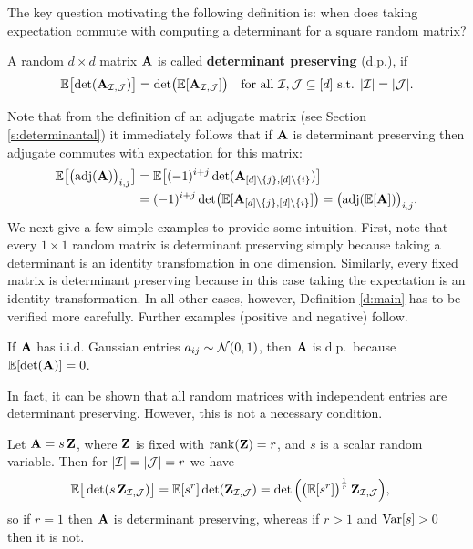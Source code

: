 \documentclass[11pt]{article}
\begin{document}
The key question motivating the following definition is: when does taking expectation commute with computing a determinant for a square random matrix? 
\begin{definition}\label{d:main}
A random $d\times d$ matrix $\mathbf A$ is called \textbf{determinant
  preserving} (d.p.), if
\begin{align*}
  \mathbb E\big[\!\det(\mathbf A_{\mathcal I,\mathcal{J}})\big] =
  \det\!\big(\mathbb E[\mathbf A_{\mathcal I,\mathcal{J}}]\big)\quad \text{for all }\mathcal I,\mathcal{J}\subseteq
  [d]\text{ s.t. }|\mathcal I|=|\mathcal{J}|.
\end{align*}
\end{definition}
Note that from the definition of an adjugate matrix (see Section
\ref{s:determinantal}) it immediately follows that if $\mathbf A$ is
determinant preserving then adjugate commutes with expectation for this matrix:
\begin{align}
  \mathbb E\big[\big(\!\operatorname{\textnormal{adj}}(\mathbf A)\big)_{i,j}\big] &=
  \mathbb E\big[(-1)^{i+j}\det(\mathbf A_{[d]\backslash\{j\},[d]\backslash\{i\}})\big]\nonumber
  \\
&=(-1)^{i+j}\det\!\big(\mathbb E[\mathbf A_{[d]\backslash\{j\},[d]\backslash\{i\}}]\big)
  = \big(\!\operatorname{\textnormal{adj}}(\mathbb E[\mathbf A])\big)_{i,j}.\label{eq:adj}
\end{align}
We next give a few simple examples to provide some intuition. First, note
that every $1\times 1$ random matrix is determinant preserving simply
because taking a determinant is an identity transfomation in one
dimension. Similarly, every fixed matrix is determinant preserving because
in this case taking the expectation is an identity
transformation. In all other cases, however, Definition \ref{d:main}
has to be verified more carefully. Further examples (positive and
negative) follow.
\begin{example}
If $\mathbf A$ has i.i.d. Gaussian entries $a_{ij}\sim\mathcal{N}(0,1)$, then
$\mathbf A$ is d.p.~because $\mathbb E[\det(\mathbf A)]=0$.
\end{example}
In fact, it can be shown that all random matrices with independent entries
are determinant preserving. However, this is not a necessary condition.
\begin{example}\label{e:rank-1}
Let $\mathbf A = s\,\mathbf Z$, where $\mathbf Z$ is fixed with $\mathrm{rank}(\mathbf Z) = r$, and $s$
is a scalar random variable. Then for $|\mathcal I|=|\mathcal{J}|=r$ we have
\begin{align*}
  \mathbb E\big[\det(s\,\mathbf Z_{\mathcal I,\mathcal{J}})\big] &= \mathbb E[s^r]\det(\mathbf Z_{\mathcal I,\mathcal{J}})
                                      =\det\Big(\big(\mathbb E[s^r]\big)^{\frac1r}\,\mathbf Z_{\mathcal I,\mathcal{J}}\Big), 
\end{align*}
  so if $r=1$ then $\mathbf A$ is determinant preserving, whereas if $r>1$
  and $\mathrm{Var}[s]>0$ then it is not.
\end{example}
\end{document}
